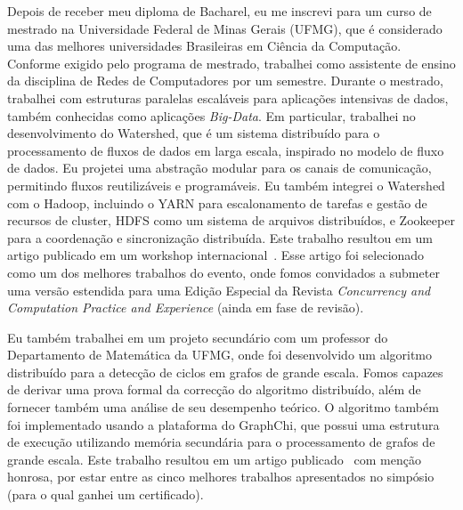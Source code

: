\documentclass{article}
\begin{document}
Depois de receber meu diploma de Bacharel, eu me inscrevi para um curso de mestrado na
Universidade Federal de Minas Gerais (UFMG), que \'{e} considerado uma das
melhores universidades Brasileiras em Ci\^{e}ncia da Computa\c{c}\~{a}o. Conforme exigido pelo programa de mestrado,
trabalhei como assistente de ensino da disciplina de Redes de Computadores por um semestre.
Durante o mestrado, trabalhei com estruturas paralelas escal\'{a}veis ​​para aplica\c{c}\~{o}es intensivas de dados,
tamb\'{e}m conhecidas como aplica\c{c}\~{o}es {\em Big-Data}. Em particular, trabalhei no
desenvolvimento do Watershed, que \'{e} um sistema distribu\'{i}do para o
processamento de fluxos de dados em larga escala, inspirado no modelo de fluxo de dados. Eu projetei
uma abstra\c{c}\~{a}o modular para os canais de comunica\c{c}\~{a}o, permitindo
fluxos reutiliz\'{a}veis ​​e program\'{a}veis. Eu tamb\'{e}m integrei o Watershed com o Hadoop,
incluindo o YARN para escalonamento de tarefas e gest\~{a}o de recursos de cluster,
HDFS como um sistema de arquivos distribu\'{i}dos, e Zookeeper para a coordena\c{c}\~{a}o e
sincroniza\c{c}\~{a}o distribu\'{i}da.
Este trabalho resultou em um artigo publicado em um
workshop internacional~\cite{rocha2014watershed}. Esse artigo foi selecionado como
um dos melhores trabalhos do evento, onde fomos convidados a
submeter uma vers\~{a}o estendida para uma Edi\c{c}\~{a}o Especial da Revista {\em Concurrency and
Computation Practice and Experience} (ainda em fase de revis\~{a}o).

Eu tamb\'{e}m trabalhei em um projeto secund\'{a}rio com um professor do Departamento de
Matem\'{a}tica da UFMG, onde foi desenvolvido um algoritmo distribu\'{i}do para a detec\c{c}\~{a}o de ciclos
em grafos de grande escala. Fomos capazes de derivar uma prova formal da correc\c{c}\~{a}o do
algoritmo distribu\'{i}do, al\'{e}m de fornecer tamb\'{e}m uma an\'{a}lise de seu
desempenho te\'{o}rico. O algoritmo tamb\'{e}m foi implementado usando a plataforma do GraphChi,
que possui uma estrutura de execu\c{c}\~{a}o utilizando mem\'{o}ria secund\'{a}ria para o processamento
de grafos de grande escala. Este trabalho resultou em um artigo publicado~\cite{rocha2015cycles} com
men\c{c}\~{a}o honrosa, por estar entre as cinco melhores trabalhos
apresentados no simp\'{o}sio (para o qual ganhei um certificado).
\end{document}
